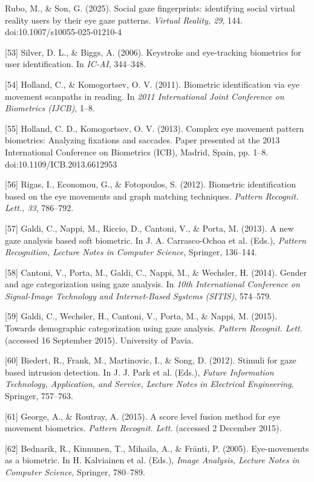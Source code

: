 \documentclass[12pt]{report}
\begin{document}
\begin{raggedright}
[52] Rubo, M., \& Son, G. (2025). Social gaze fingerprints: identifying social virtual reality users by their eye gaze patterns. \textit{Virtual Reality, 29}, 144. doi:10.1007/s10055-025-01210-4

[53] Silver, D. L., \& Biggs, A. (2006). Keystroke and eye-tracking biometrics for user identification. In \textit{IC-AI}, 344–348.

[54] Holland, C., \& Komogortsev, O. V. (2011). Biometric identification via eye movement scanpaths in reading. In \textit{2011 International Joint Conference on Biometrics (IJCB)}, 1–8.

[55] Holland, C. D., Komogortsev, O. V. (2013). Complex eye movement pattern biometrics: Analyzing fixations and saccades. Paper presented at the 2013 International Conference on Biometrics (ICB), Madrid, Spain, pp. 1–8. doi:10.1109/ICB.2013.6612953

[56] Rigas, I., Economou, G., \& Fotopoulos, S. (2012). Biometric identification based on the eye movements and graph matching techniques. \textit{Pattern Recognit. Lett., 33}, 786–792.

[57] Galdi, C., Nappi, M., Riccio, D., Cantoni, V., \& Porta, M. (2013). A new gaze analysis based soft biometric. In J. A. Carrasco-Ochoa et al. (Eds.), \textit{Pattern Recognition, Lecture Notes in Computer Science}, Springer, 136–144.

[58] Cantoni, V., Porta, M., Galdi, C., Nappi, M., \& Wechsler, H. (2014). Gender and age categorization using gaze analysis. In \textit{10th International Conference on Signal-Image Technology and Internet-Based Systems (SITIS)}, 574–579.

[59] Galdi, C., Wechsler, H., Cantoni, V., Porta, M., \& Nappi, M. (2015). Towards demographic categorization using gaze analysis. \textit{Pattern Recognit. Lett.} (accessed 16 September 2015). University of Pavia.

[60] Biedert, R., Frank, M., Martinovic, I., \& Song, D. (2012). Stimuli for gaze based intrusion detection. In J. J. Park et al. (Eds.), \textit{Future Information Technology, Application, and Service, Lecture Notes in Electrical Engineering}, Springer, 757–763.

[61] George, A., \& Routray, A. (2015). A score level fusion method for eye movement biometrics. \textit{Pattern Recognit. Lett.} (accessed 2 December 2015).

[62] Bednarik, R., Kinnunen, T., Mihaila, A., \& Fränti, P. (2005). Eye-movements as a biometric. In H. Kalviainen et al. (Eds.), \textit{Image Analysis, Lecture Notes in Computer Science}, Springer, 780–789.


\end{raggedright}
\end{document}
